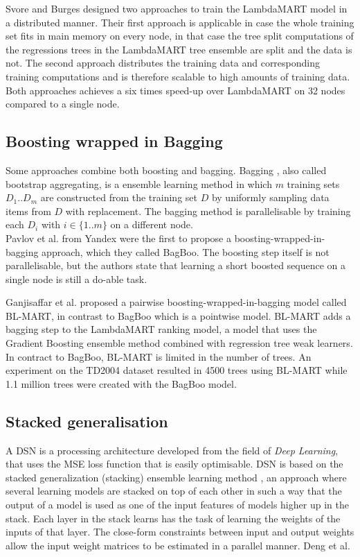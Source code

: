 Svore and Burges \cite{Svore2010,Svore2012} designed two approaches to train the LambdaMART \cite{Wu2008} model in a distributed manner. Their first approach is applicable in case the whole training set fits in main memory on every node, in that case the tree split computations of the regressions trees in the LambdaMART tree ensemble are split and the data is not. The second approach distributes the training data and corresponding training computations and is therefore scalable to high amounts of training data. Both approaches achieves a six times speed-up over LambdaMART on 32 nodes compared to a single node.

\subsection{Boosting wrapped in Bagging}
Some approaches combine both boosting and bagging. Bagging \cite{Breiman1996}, also called bootstrap aggregating, is a ensemble learning method in which $m$ training sets $D_1..D_m$ are constructed from the training set $D$ by uniformly sampling data items from $D$ with replacement. The bagging method is parallelisable by training each $D_i$ with $i \in \{1..m\}$ on a different node.\\

Pavlov et al. \cite{Pavlov2010} from Yandex were the first to propose a boosting-wrapped-in-bagging approach, which they called BagBoo. The boosting step itself is not parallelisable, but the authors state that learning a short boosted sequence on a single node is still a do-able task.

Ganjisaffar et al. \cite{Ganjisaffar2011c, Ganjisaffar2011b} proposed a pairwise boosting-wrapped-in-bagging model called BL-MART, in contrast to BagBoo which is a pointwise model. BL-MART adds a bagging step to the LambdaMART \cite{Wu2008} ranking model, a model that uses the Gradient Boosting \cite{Friedman2002} ensemble method combined with regression tree weak learners. In contract to BagBoo, BL-MART is limited in the number of trees. An experiment on the TD2004 dataset resulted in 4500 trees using BL-MART while 1.1 million trees were created with the BagBoo model.

\subsection{Stacked generalisation}
A \ac{DSN} is a processing architecture developed from the field of \emph{Deep Learning}, that uses the \ac{MSE} loss function that is easily optimisable. \ac{DSN} is based on the stacked generalization (stacking) ensemble learning method \cite{Wolpert1992}, an approach where several learning models are stacked on top of each other in such a way that the output of a model is used as one of the input features of models higher up in the stack. Each layer in the stack learns has the task of learning the weights of the inputs of that layer. The close-form constraints between input and output weights allow the input weight matrices to be estimated in a parallel manner. Deng et al. \cite{Deng2013} %

